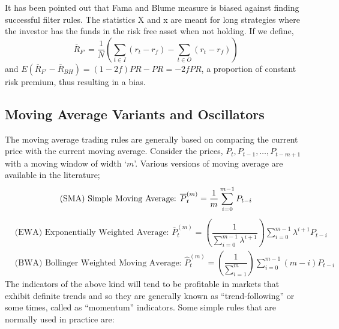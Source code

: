 It has been pointed out that Fama and Blume measure is biased against finding successful filter rules. The statistics X and x are meant for long strategies where the investor has the funds in the risk free asset when not holding. If we define,
	\[
	\overline{R}_{F'} = \dfrac{1}{N} \left( \sum_{t\in I} (r_t - r_f) - \sum_{t \in O} (r_t - r_f) \right)
	\]
and $E(\overline{R}_{{F}'} - \overline{R}_{BH}) = (1 - 2f) PR - PR = -2f PR$, a proportion of constant risk premium, thus resulting in a bias.


\subsection{Moving Average Variants and Oscillators}


The moving average trading rules are generally based on comparing the current price with the current moving average. Consider the prices, $P_t, P_{t-1}, \ldots, P_{t-m+1}$ with a moving window of width `$m$'. Various versions of moving average are available in the literature; 
	\begin{equation}\label{eqn:multi}
	\text{(SMA) Simple Moving Average: } \overline{P}_t^{(m)}= \dfrac{1}{m} \sum_{i=0}^{m-1} P_{t-i} \hfill
	\end{equation}
	\begin{equation*}
	\begin{split}
	&\text{(EWA) Exponentially Weighted Average: } \overline{P}_t^{(m)} = \left(\dfrac{1}{\sum_{i=0}^{m-1} \lambda^{i+1}} \right) \sum_{i=0}^{m-1} \lambda^{i+1} P_{t-i} \\
	&\text{(BWA) Bollinger Weighted Moving Average: }  \hat{P}_t^{(m)}= \left(\dfrac{1}{\sum_{i=1}^m}\right) \sum_{i=0}^{m-1} (m-i) P_{t-i}
	\end{split}
	\end{equation*}
The indicators of the above kind will tend to be profitable in markets that exhibit definite trends and so they are generally known as ``trend-following'' or some times, called as ``momentum'' indicators. Some simple rules that are normally used in practice are: \\[0.1cm]
\noindent{} \\

